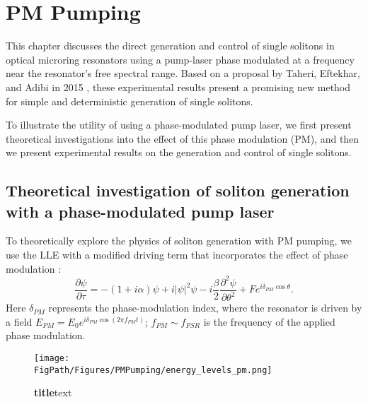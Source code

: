  \chapter{PM Pumping} \label{ch:PMPumping}

This chapter discusses the direct generation and control of single solitons in optical microring resonators using a pump-laser phase modulated at a frequency near the resonator's free spectral range. Based on a proposal by Taheri, Eftekhar, and Adibi in 2015 \cite{Taheri2015}, these experimental results present a promising new method for simple and deterministic generation of single solitons. 

To illustrate the utility of using a phase-modulated pump laser, we first present theoretical investigations into the effect of this phase modulation (PM), and then we present experimental results on the generation and control of single solitons.

\section{Theoretical investigation of soliton generation with a phase-modulated pump laser}


To theoretically explore the physics of soliton generation with PM pumping, we use the LLE with a modified driving term that incorporates the effect of phase modulation \cite{Taheri2015}:
\begin{equation}
\frac{\partial \psi}{\partial \tau}=-(1+i \alpha) \psi + i|\psi|^2 \psi -i \frac{\beta}{2} \frac{\partial^2 \psi}{\partial \theta^2} +Fe^{i\delta_{PM}\cos{\theta}}. \label{eq:PMLLE}
\end{equation}
Here $\delta_{PM}$ represents the phase-modulation index, where the resonator is driven by a field $E_{PM}=E_0 e^{i\delta_{PM}\cos(2\pi f_{PM}t)}$; $f_{PM}\sim f_{FSR}$ is the frequency of the applied phase modulation.

\begin{figure}[htpb]
	\begin{center}
		\texttt{[image: \\FigPath/Figures/PMPumping/energy\_levels\_pm.png]}
	\end{center}
	\caption[Figure Title]{\textbf{title}text}
	\label{fig:PMenergylevels}
\end{figure} 

